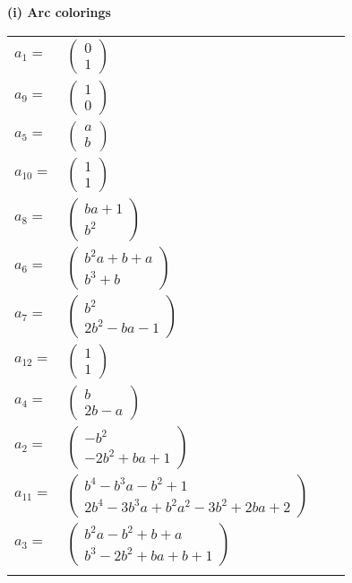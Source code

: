 \documentclass[1p]{elsarticle_modified}
\theoremstyle{definition}
\begin{document}
\flushleft \textbf{(i) Arc colorings}\\
\begin{tabular}{m{7pt} m{180pt} m{7pt} m{180pt} }
\flushright $a_{1}=$&$\begin{pmatrix}0\\1\end{pmatrix}$ \\
\flushright $a_{9}=$&$\begin{pmatrix}1\\0\end{pmatrix}$ \\
\flushright $a_{5}=$&$\begin{pmatrix}a\\b\end{pmatrix}$ \\
\flushright $a_{10}=$&$\begin{pmatrix}1\\1\end{pmatrix}$ \\
\flushright $a_{8}=$&$\begin{pmatrix}b a+1\\b^2\end{pmatrix}$ \\
\flushright $a_{6}=$&$\begin{pmatrix}b^2 a+b+a\\b^3+b\end{pmatrix}$ \\
\flushright $a_{7}=$&$\begin{pmatrix}b^2\\2 b^2- b a-1\end{pmatrix}$ \\
\flushright $a_{12}=$&$\begin{pmatrix}1\\1\end{pmatrix}$ \\
\flushright $a_{4}=$&$\begin{pmatrix}b\\2 b- a\end{pmatrix}$ \\
\flushright $a_{2}=$&$\begin{pmatrix}- b^2\\-2 b^2+b a+1\end{pmatrix}$ \\
\flushright $a_{11}=$&$\begin{pmatrix}b^4- b^3 a- b^2+1\\2 b^4-3 b^3 a+b^2 a^2-3 b^2+2 b a+2\end{pmatrix}$ \\
\flushright $a_{3}=$&$\begin{pmatrix}b^2 a- b^2+b+a\\b^3-2 b^2+b a+b+1\end{pmatrix}$\\&\end{tabular}
\end{document}
